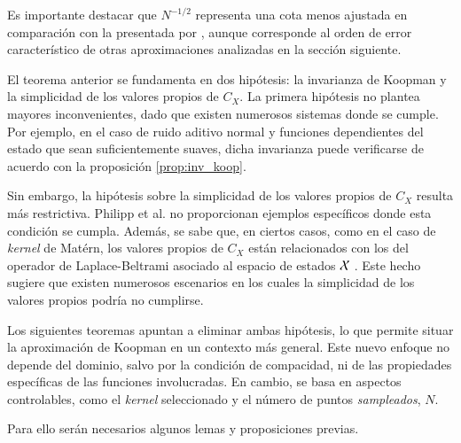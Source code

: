 Es importante destacar que \( N^{-1/2} \) representa una cota menos ajustada en comparación con la presentada por \cite{Philipp2024ErrorOperator}, aunque corresponde al orden de error característico de otras aproximaciones analizadas en la sección siguiente.

El teorema anterior se fundamenta en dos hipótesis: la invarianza de Koopman y la simplicidad de los valores propios de \( C_X \). La primera hipótesis no plantea mayores inconvenientes, dado que existen numerosos sistemas donde se cumple. Por ejemplo, en el caso de ruido aditivo normal y funciones dependientes del estado que sean suficientemente suaves, dicha invarianza puede verificarse de acuerdo con la proposición \ref{prop:inv_koop}.

Sin embargo, la hipótesis sobre la simplicidad de los valores propios de \( C_X \) resulta más restrictiva. Philipp et al. no proporcionan ejemplos específicos donde esta condición se cumpla. Además, se sabe que, en ciertos casos, como en el caso de \textit{kernel} de Matérn, los valores propios de \( C_X \) están relacionados con los del operador de Laplace-Beltrami asociado al espacio de estados \( \mathcal{X} \) \cite{Whittle1963StochasticDimensions, Borovitskiy2020MaternManifolds}. Este hecho sugiere que existen numerosos escenarios en los cuales la simplicidad de los valores propios podría no cumplirse.

Los siguientes teoremas apuntan a eliminar ambas hipótesis, lo que permite situar la aproximación de Koopman en un contexto más general. Este nuevo enfoque no depende del dominio, salvo por la condición de compacidad, ni de las propiedades específicas de las funciones involucradas. En cambio, se basa en aspectos controlables, como el \textit{kernel} seleccionado y el número de puntos \textit{sampleados}, \( N \).

Para ello serán necesarios algunos lemas y proposiciones previas.


